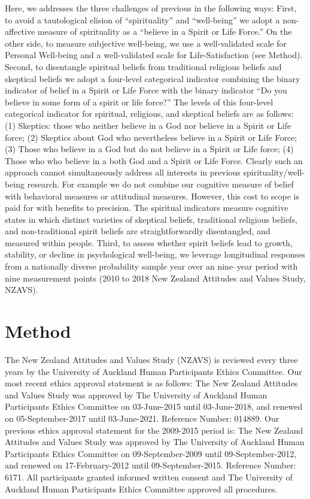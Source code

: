 \documentclass[
  english,
  man]{apa6}
\begin{document}
Here, we addresses the three challenges of previous in the following ways: First, to avoid a tautological elision of \enquote{spirituality} and \enquote{well-being} we adopt a non-affective measure of spirituality as a \enquote{believe in a Spirit or Life Force.} On the other side, to measure subjective well-being, we use a well-validated scale for Personal Well-being and a well-validated scale for Life-Satisfaction (see Method). Second, to disentangle spiritual beliefs from traditional religious beliefs and skeptical beliefs we adopt a four-level categorical indicator combining the binary indicator of belief in a Spirit or Life Force with the binary indicator \enquote{Do you believe in some form of a spirit or life force?} The levels of this four-level categorical indicator for spiritual, religious, and skeptical beliefs are as follows: (1) Skeptics: those who neither believe in a God nor believe in a Spirit or Life force; (2) Skeptics about God who nevertheless believe in a Spirit or Life Force; (3) Those who believe in a God but do not believe in a Spirit or Life force; (4) Those who who believe in a both God and a Spirit or Life Force. Clearly such an approach cannot simultaneously address all interests in previous spirituality/well-being research. For example we do not combine our cognitive measure of belief with behavioral measures or attitudinal measures. However, this cost to scope is paid for with benefits to precision. The spiritual indicators measure cognitive states in which distinct varieties of skeptical beliefs, traditional religious beliefs, and non-traditional spirit beliefs are straightforwardly disentangled, and measured within people. Third, to assess whether spirit beliefs lead to growth, stability, or decline in psychological well-being, we leverage longitudinal responses from a nationally diverse probability sample year over an nine--year period with nine measurement points (2010 to 2018 New Zealand Attitudes and Values Study, NZAVS).

\hypertarget{method}{%
\section{Method}\label{method}}

The New Zealand Attitudes and Values Study (NZAVS) is reviewed every three years by the University of Auckland Human Participants Ethics Committee. Our most recent ethics approval statement is as follows: The New Zealand Attitudes and Values Study was approved by The University of Auckland Human Participants Ethics Committee on 03-June-2015 until 03-June-2018, and renewed on 05-September-2017 until 03-June-2021. Reference Number: 014889. Our previous ethics approval statement for the 2009-2015 period is: The New Zealand Attitudes and Values Study was approved by The University of Auckland Human Participants Ethics Committee on 09-September-2009 until 09-September-2012, and renewed on 17-February-2012 until 09-September-2015. Reference Number: 6171. All participants granted informed written consent and The University of Auckland Human Participants Ethics Committee approved all procedures.
\end{document}
